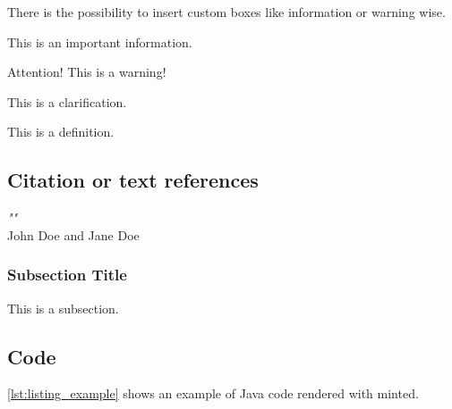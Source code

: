 There is the possibility to insert custom boxes like  information or warning wise.

\begin{info}
    This is an important information.
\end{info}

\begin{warning}
    Attention! This is a warning!
\end{warning}

\begin{clarification}
    This is a clarification.
\end{clarification}

\begin{definition}
    This is a definition.
\end{definition}

\subsection{Citation or text references}
\begin{tcolorbox}[
        colback=white,
        colframe=languidlavender,
        sharp corners,
        title={\textit{Citation}},
        fonttitle=\bfseries\color{black}
    ]
    \textit{"\lipsum[1][1]"} \\[1ex]
    \hfill John Doe and Jane Doe
\end{tcolorbox}

\subsubsection{Subsection Title}

This is a subsection.

\subsection{Code}

\autoref{lst:listing_example} shows an example of Java code rendered with minted.

\begin{listing}[H]
    \caption{Example of listing using the minted package}
    \label{lst:listing_example}
\end{listing}


